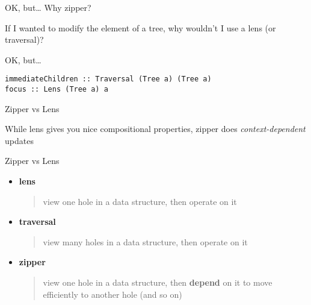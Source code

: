 \begin{frame}
\begin{block}{OK, but\ldots}
Why zipper?

If I wanted to modify the element of a tree, why wouldn't I use a lens (or traversal)?
\end{block}
\end{frame}

\begin{frame}[fragile]
\begin{block}{OK, but\ldots}
\begin{lstlisting}[style=haskell]
immediateChildren :: Traversal (Tree a) (Tree a)
focus :: Lens (Tree a) a
\end{lstlisting}
\end{block}
\end{frame}

\begin{frame}
\begin{block}{Zipper vs Lens}
\begin{center}
While lens gives you nice compositional properties, zipper does \emph{context-dependent} updates
\end{center}
\end{block}
\end{frame}

\begin{frame}
\begin{block}{Zipper vs Lens}
\begin{center}
\begin{itemize}
  \item \textbf{lens} \begin{quote}view one hole in a data structure, then operate on it\end{quote}
  \item \textbf{traversal} \begin{quote}view many holes in a data structure, then operate on it\end{quote}
  \item \textbf{zipper} \begin{quote}view one hole in a data structure, then \textbf{depend} on it to move efficiently to another hole (and so on)\end{quote}
\end{itemize}
\end{center}
\end{block}
\end{frame}

